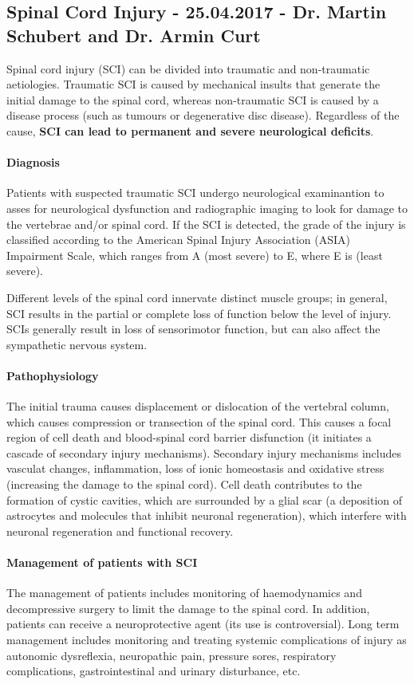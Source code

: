 \documentclass[12pt,article,oneside,a4paper]{memoir}
\begin{document}
\subsection{Spinal Cord Injury - 25.04.2017 - Dr. Martin Schubert and Dr. Armin Curt}

Spinal cord injury (SCI) can be divided into traumatic and non-traumatic aetiologies. Traumatic SCI is caused by mechanical insults that generate the initial damage to the spinal cord, whereas non-traumatic SCI is caused by a disease process (such as tumours or degenerative disc disease). Regardless of the cause, \textbf{SCI can lead to permanent and severe neurological deficits}.

\paragraph{Diagnosis}
Patients with suspected traumatic SCI undergo neurological examinantion to asses for neurological dysfunction and radiographic imaging to look for damage to the vertebrae and/or spinal cord.
If the SCI is detected, the grade of the injury is classified according to the American Spinal Injury Association (ASIA) Impairment Scale, which ranges from A (most severe) to E, where E is (least severe).

Different levels of the spinal cord innervate distinct muscle groups; in general, SCI results in the partial or complete loss of function below the level of injury. SCIs generally result in loss of sensorimotor function, but can also affect the sympathetic nervous system.

\paragraph{Pathophysiology}
The initial trauma causes displacement or dislocation of the vertebral column, which causes compression or transection of the spinal cord. This causes a focal region of cell death and blood-spinal cord barrier disfunction (it initiates a cascade of secondary injury mechanisms). Secondary injury mechanisms includes vasculat changes, inflammation, loss of ionic homeostasis and oxidative stress (increasing the damage to the spinal cord). Cell death contributes to the formation of cystic cavities, which are surrounded by a glial scar (a deposition of astrocytes and molecules that inhibit neuronal regeneration), which interfere with neuronal regeneration and functional recovery.

\paragraph{Management of patients with SCI}
The management of patients includes monitoring of haemodynamics and decompressive surgery to limit the damage to the spinal cord. In addition, patients can receive a neuroprotective agent (its use is controversial). Long term management includes monitoring and treating systemic complications of injury as autonomic dysreflexia, neuropathic pain, pressure sores, respiratory complications, gastrointestinal and urinary disturbance, etc.
\end{document}
